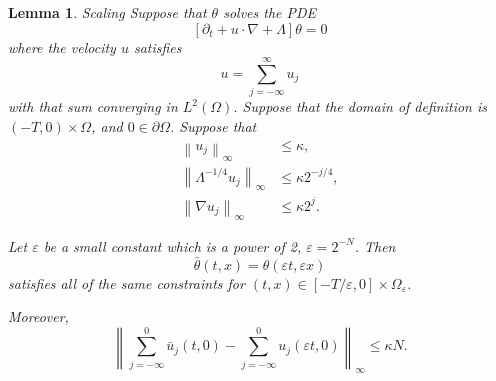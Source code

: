 \documentclass[11pt]{amsart}
\newtheorem{lemma}[theorem]{Lemma}
\theoremstyle{remark}
\newcommand{\eps}{\varepsilon}
\newcommand{\norm}[1]{\left\lVert#1\right\rVert}
\newcommand{\bracket}[1]{\left[ #1 \right]}
\newcommand{\del}{\partial}
\newcommand{\grad}{\nabla}
\begin{document}
\begin{lemma}{Scaling}
Suppose that $\theta$ solves the PDE
\[ \bracket{\del_t + u\cdot\grad + \Lambda} \theta = 0\]
where the velocity $u$ satisfies
\[ u = \sum_{j=-\infty}^\infty u_j \]
with that sum converging in $L^2(\Omega)$.  Suppose that the domain of definition is $(-T,0) \times \Omega$, and $0 \in \del \Omega$.  Suppose that
\begin{align*}
\norm{u_j}_\infty &\leq \kappa, \\
\norm{\Lambda^{-1/4} u_j}_\infty &\leq \kappa 2^{-j/4}, \\
\norm{\grad u_j}_\infty &\leq \kappa 2^j.
\end{align*}

Let $\eps$ be a small constant which is a power of 2, $\eps = 2^{-N}$. Then
\[ \bar{\theta}(t,x) = \theta(\eps t, \eps x) \]
satisfies all of the same constraints for $(t,x) \in [-T/\eps, 0]\times \Omega_\eps$.  

Moreover, 
\[ \norm{\sum_{j=-\infty}^0 \bar{u}_j(t,0) - \sum_{j=-\infty}^0 u_j(\eps t, 0)}_\infty \leq \kappa N. \]
\end{lemma}
\end{document}
